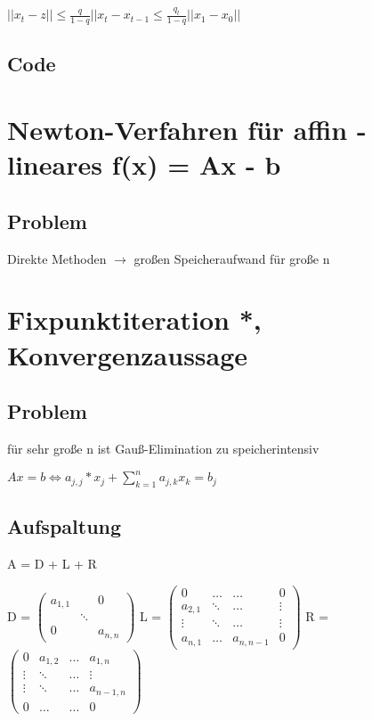 \documentclass[12pt,a4paper]{article} %
\begin{document}
	$||x_t - z|| \le \frac{q}{1 - q} ||x_t - x_{t - 1} \le \frac{q_t}{1 - q} ||x_1 - x_0||$
	
	\subsection{Code}
	
	\newpage
	
	\section{Newton-Verfahren für affin - lineares f(x) = Ax - b}
	
	\subsection{Problem}
	
	Direkte Methoden $\rightarrow$ großen Speicheraufwand für große n
	
	\newpage
	
	\section{Fixpunktiteration *, Konvergenzaussage}
	
	\subsection{Problem}
	
	für sehr große n ist Gauß-Elimination zu speicherintensiv
	
	$Ax = b \Leftrightarrow a_{j, j} * x_j + \sum\limits_{k = 1}^na_{j, k}x_k = b_j$
	
	\subsection{Aufspaltung}
	
	A = D + L + R
	
	D = 
	$\begin{pmatrix}
		a_{1, 1} & & 0 \\
		& \ddots & \\
		0 & & a_{n, n}
	\end{pmatrix}$
	L = 
	$\begin{pmatrix}
		0 & \dotsc & \dotsc & 0 \\
		a_{2, 1} & \ddots & \dotsc & \vdots \\
		\vdots & \ddots & \dotsc & \vdots \\
		a_{n, 1} & \dotsc & a_{n, n - 1} & 0
	\end{pmatrix}$
	R = 
	$\begin{pmatrix}
		0 & a_{1, 2} & \dotsc & a_{1, n} \\
		\vdots & \ddots & \dotsc & \vdots \\
		\vdots & \ddots & \dotsc & a_{n - 1, n} \\
		0 & \dotsc & \dotsc & 0
	\end{pmatrix}$
	
\end{document}
